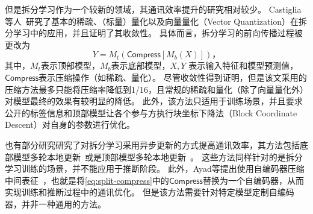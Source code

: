 %
但是拆分学习作为一个较新的领域，其通讯效率提升的研究相对较少。
%
Castiglia等人~\cite{castiglia2022compressed_vfl}研究了基本的稀疏、（标量）量化以及向量量化（Vector Quantization）在拆分学习中的应用，并且证明了其收敛性。
%
具体而言，拆分学习的前向传播过程被更改为
\begin{equation}
\label{eq:split-compress}
    Y = M_t(\mathsf{Compress}[M_b(X)])，
\end{equation}
%
其中，$M_t$表示顶部模型，$M_b$表示底部模型，$X, Y$ 表示输入特征和模型预测值，$\mathsf{Compress}$表示压缩操作（如稀疏、量化）。
%
尽管收敛性得到证明，但是该文采用的压缩方法最多只能将压缩率降低到1/16，且常规的稀疏和量化（除了向量量化外）对模型最终的效果有较明显的降低。
%
此外，该方法只适用于训练场景，并且要求公开的标签信息和顶部模型让各个参与方执行块坐标下降法（Block Coordinate Descent）对自身的参数进行优化。

也有部分研究研究了对拆分学习采用异步更新的方式提高通讯效率，其方法包括底部模型多轮本地更新~\cite{fu2022cache_vfl}或是顶部模型多轮本地更新~\cite{chen2021async_split}。
%
这些方法同样针对的是拆分学习训练的场景，并不能应用于推断阶段。
%
此外，Ayad等提出使用自编码器压缩中间表征~\cite{ayad202vfl}，也就是将\eqref{eq:split-compress}中的$\mathsf{Compress}$替换为一个自编码器，从而实现训练和推断过程中的通讯优化。
%
但是该方法需要针对特定模型定制自编码器，并非一种通用的方法。